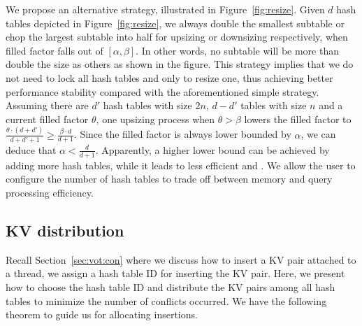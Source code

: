 We propose an alternative strategy, illustrated in Figure~\ref{fig:resize}. 
Given $d$ hash tables depicted in Figure~\ref{fig:resize},
we always double the smallest subtable or chop the largest subtable into half for upsizing or downsizing respectively, when filled factor falls out of $[\alpha,\beta]$. 
In other words, no subtable will be more than double the size as others as shown in the figure. This strategy implies that we do not need to lock all hash tables and only to resize one, thus achieving better performance stability compared with the aforementioned simple strategy. 
Assuming there are $d'$ hash tables with size $2n$, $d-d'$ tables with size $n$ and a current filled factor $\theta$, 
one upsizing process when $\theta > \beta$ lowers the filled factor to $\frac{\theta\cdot(d+d')}{d+d'+1} \geq \frac{\beta \cdot d}{d+1}$.  
Since the filled factor is always lower bounded by $\alpha$, we can deduce that $\alpha < \frac{d}{d+1}$.
Apparently, a higher lower bound can be achieved by adding more hash tables, while it leads to less efficient  and . 
We allow the user to configure the number of hash tables to trade off between memory and query processing efficiency. 

\subsection{KV distribution}\label{sec:dyn:distribute}
Recall Section~\ref{sec:vot:con} where we discuss how to insert a KV pair attached to a thread, 
we assign a hash table ID for inserting the KV pair.
Here, we present how to choose the hash table ID and distribute the KV pairs among all hash tables to minimize the number of conflicts occurred.
We have the following theorem to guide us for allocating insertions. 

